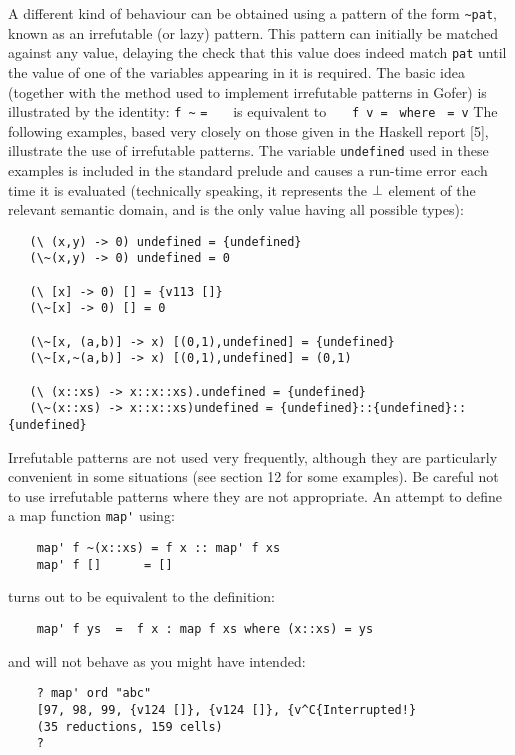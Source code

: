 A different kind of behaviour can be obtained using a  pattern  of  the
form \verb"~pat", 
known as an irrefutable (or lazy) pattern.  This pattern can
initially be matched against any value, delaying the  check  that  this
value does indeed match \verb"pat" until the value of  one  of  the  variables
appearing in it is required.  The basic idea (together with the  method
used to implement irrefutable patterns in Gofer) is illustrated by  the
identity:
\BQ
    \verb"f ~" \verb"="  ~~~is equivalent to~~~
    \verb"f v = " \verb"where " \verb"= v"
\EQ
The following examples, based  very  closely  on  those  given  in  the
Haskell report [5], illustrate the use of  irrefutable  patterns.   The
variable \verb"undefined" used in these examples is included in the standard
prelude  and  causes  a  run-time  error  each  time  it  is  evaluated
(technically speaking, it represents the $\perp$ element of the relevant
semantic domain, and is the only value having all possible types):
\begin{verbatim}
   (\ (x,y) -> 0) undefined = {undefined}
   (\~(x,y) -> 0) undefined = 0

   (\ [x] -> 0) [] = {v113 []}
   (\~[x] -> 0) [] = 0

   (\~[x, (a,b)] -> x) [(0,1),undefined] = {undefined}
   (\~[x,~(a,b)] -> x) [(0,1),undefined] = (0,1)

   (\ (x::xs) -> x::x::xs).undefined = {undefined}
   (\~(x::xs) -> x::x::xs)undefined = {undefined}::{undefined}::{undefined}
\end{verbatim}
Irrefutable patterns are not used very frequently,  although  they  are
particularly convenient in some situations (see  section  12  for  some
examples).  Be careful not to use irrefutable patterns where  they  are
not appropriate.  An attempt to define a map function \verb"map'" using:
\begin{verbatim}
    map' f ~(x::xs) = f x :: map' f xs
    map' f []      = []
\end{verbatim}
turns out to be equivalent to the definition:
\begin{verbatim}
    map' f ys  =  f x : map f xs where (x::xs) = ys
\end{verbatim}
and will not behave as you might have intended:
\begin{verbatim}
    ? map' ord "abc"
    [97, 98, 99, {v124 []}, {v124 []}, {v^C{Interrupted!}
    (35 reductions, 159 cells)
    ?
\end{verbatim}

